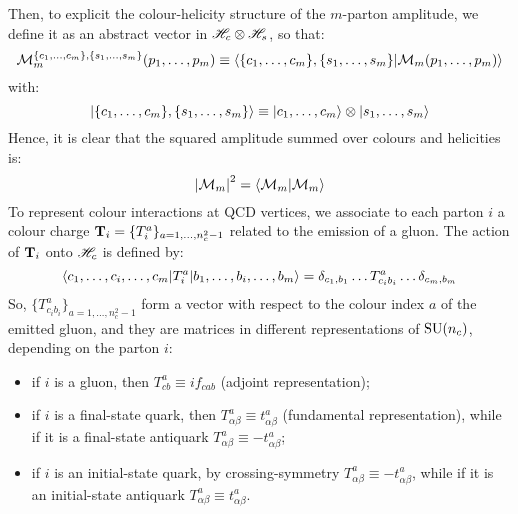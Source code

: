 Then, to explicit the colour-helicity structure of the $ m $-parton amplitude, we define it as an abstract vector in $ \mathscr{H}_c \otimes \mathscr{H}_s $, so that:
\begin{equation}
  \mathcal{M}_m^{\{c_1, \dots, c_m\}, \{s_1, \dots, s_m\}}(p_1, \dots, p_m) \equiv \braket{\{c_1, \dots, c_m\}, \{s_1, \dots, s_m\} | \mathcal{M}_m(p_1, \dots, p_m)}
\end{equation}
with:
\begin{equation*}
  \ket{\{c_1, \dots, c_m\}, \{s_1, \dots, s_m\}} \equiv \ket{c_1, \dots, c_m} \otimes \ket{s_1, \dots, s_m}
\end{equation*}
Hence, it is clear that the squared amplitude summed over colours and helicities is:
\begin{equation}
  \left\lvert\mathcal{M}_m\right\rvert^2 = \braket{\mathcal{M}_m | \mathcal{M}_m}
\end{equation}
To represent colour interactions at QCD vertices, we associate to each parton $ i $ a colour charge $ \mathbf{T}_i = \{T_i^a\}_{a = 1, \dots, n_c^2 - 1} $ related to the emission of a gluon. The action of $ \mathbf{T}_i $ onto $ \mathscr{H}_c $ is defined by:
\begin{equation}
  \braket{c_1, \dots, c_i, \dots, c_m | T_i^a | b_1, \dots, b_i, \dots, b_m} = \delta_{c_1, b_1} \dots T^a_{c_i b_i} \dots \delta_{c_m, b_m}
  \label{eq:t-act}
\end{equation}
So, $ \{T^a_{c_i b_i}\}_{a = 1, \dots, n_c^2 - 1} $ form a vector with respect to the colour index $ a $ of the emitted gluon, and they are matrices in different representations of $ \mathrm{SU}(n_c) $, depending on the parton $ i $:
\begin{itemize}
  \item if $ i $ is a gluon, then $ T^a_{cb} \equiv i f_{cab} $ (adjoint representation);
  \item if $ i $ is a final-state quark, then $ T^a_{\alpha \beta} \equiv t^a_{\alpha \beta} $ (fundamental representation), while if it is a final-state antiquark $ T^a_{\alpha \beta} \equiv - t^a_{\alpha \beta} $;
  \item if $ i $ is an initial-state quark, by crossing-symmetry $ T^a_{\alpha \beta} \equiv - t^a_{\alpha \beta}$, while if it is an initial-state antiquark $ T^a_{\alpha \beta} \equiv t^a_{\alpha \beta} $.
\end{itemize}

